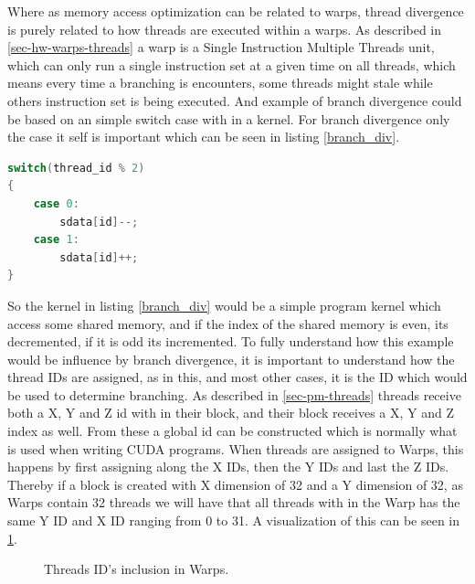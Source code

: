 Where as memory access optimization can be related to warps, thread divergence is purely related to how threads are executed within a warps. As described in \cref{sec-hw-warps-threads} a warp is a Single Instruction Multiple Threads unit, which can only run a single instruction set at a given time on all threads, which means every time a branching is encounters, some threads might stale while others instruction set is being executed. And example of branch divergence could be based on an simple switch case with in a kernel. For branch divergence only the case it self is important which can be seen in listing \cref{branch_div}.\\

\begin{lstlisting}[language=C,caption={TBD},label=lst:branch_div]
switch(thread_id % 2)
{
	case 0:
		sdata[id]--;
	case 1:
		sdata[id]++;
}
\end{lstlisting} 

So the kernel in listing \cref{branch_div} would be a simple program kernel which access some shared memory, and if the index of the shared memory is even, its decremented, if it is odd its incremented. To fully understand how this example would be influence by branch divergence, it is important to understand how the thread IDs are assigned, as in this, and most other cases, it is the ID which would be used to determine branching. As described in \cref{sec-pm-threads} threads receive both a X, Y and Z id with in their block, and their block receives a X, Y and Z index as well. From these a global id can be constructed which is normally what is used when writing CUDA programs. When threads are assigned to Warps, this happens by first assigning along the X IDs, then the Y IDs and last the Z IDs. Thereby if a block is created with X dimension of 32 and a Y dimension of 32, as Warps contain 32 threads we will have that all threads with in the Warp has the same Y ID and X ID ranging from 0 to 31. A visualization of this can be seen in \cref{fig:id_warp}.\\

\begin{figure}[ht]
	\centering
	\caption{Threads ID's inclusion in Warps.}
	\label{fig:id_warp}
\end{figure}

